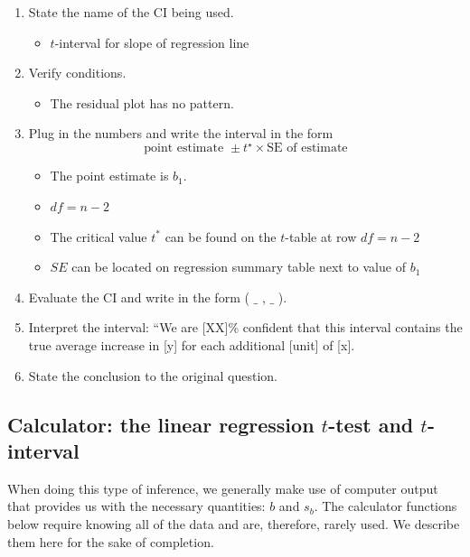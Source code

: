 \begin{termBox}{
\begin{enumerate}
\setlength{\itemsep}{0mm}
\item State the name of the CI being used.\vspace{-1.5mm}
\begin{itemize}
\setlength{\itemsep}{0mm}
\item $t$-interval for slope of regression line
\end{itemize}
\item Verify conditions.\vspace{-1.5mm}
\begin{itemize}
\setlength{\itemsep}{0mm}
\item The residual plot has no pattern.
\end{itemize}
\item Plug in the numbers and write the interval in the form
$$\text{point estimate } \pm t^\star \times \text{SE of estimate}$$
\begin{itemize}
\setlength{\itemsep}{0mm}
\item The point estimate is $b_1$.
\item $df = n-2$
\item The critical value $t^*$ can be found on the $t$-table at row $df = n-2$
\item $SE$ can be located on regression summary table next to value of $b_1$
\end{itemize}
\item Evaluate the CI and write in the form ( $\_$ , $\_$ ).
\item Interpret the interval:  ``We are [XX]\% confident that this interval contains the true average increase in [y] for each additional [unit] of [x].
\item State the conclusion to the original question.
\end{enumerate}}
\end{termBox}

\subsection{Calculator: the linear regression $t$-test and $t$-interval}

When doing this type of inference, we generally make use of computer output that provides us with the necessary quantities: $b$ and $s_b$.  The calculator functions below require knowing all of the data and are, therefore, rarely used.  We describe them here for the sake of completion. 

